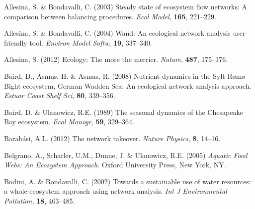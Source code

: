 \documentclass[11pt]{article}
\begin{document}
\begin{spacing}{2}
\end{spacing}
%
\begin{thebibliography}{79}
\providecommand{\natexlab}[1]{#1}

Allesina, S. \& Bondavalli, C. (2003) Steady state of ecosystem flow networks:
  A comparison between balancing procedures.
\newblock \emph{Ecol Model}, \textbf{165}, 221--229.

Allesina, S. \& Bondavalli, C. (2004) Wand: An ecological network analysis
  user-friendly tool.
\newblock \emph{Environ Model Softw}, \textbf{19}, 337--340.

Allesina, S. (2012) Ecology: The more the merrier.
\newblock \emph{Nature}, \textbf{487}, 175--176.

Baird, D., Asmus, H. \& Asmus, R. (2008) Nutrient dynamics in the
  {S}ylt-{R}{\o}m{\o} {B}ight ecosystem, {German Wadden Sea}: An ecological
  network analysis approach.
\newblock \emph{Estuar Coast Shelf Sci}, \textbf{80}, 339--356.

Baird, D. \& Ulanowicz, R.E. (1989) The seasonal dynamics of the {Chesapeake
  Bay} ecosystem.
\newblock \emph{Ecol Monogr}, \textbf{59}, 329--364.

Barab{\'a}si, A.L. (2012) The network takeover.
\newblock \emph{Nature Physics}, \textbf{8}, 14--16.

Belgrano, A., Scharler, U.M., Dunne, J. \& Ulanowicz, R.E. (2005) \emph{Aquatic
  Food Webs: An Ecosystem Approach}.
\newblock Oxford University Press, New York, NY.

Bodini, A. \& Bondavalli, C. (2002) Towards a sustainable use of water
  resources: a whole-ecosystem approach using network analysis.
\newblock \emph{Int J Environmental Pollution}, \textbf{18}, 463--485.


\end{thebibliography}
\end{document}
